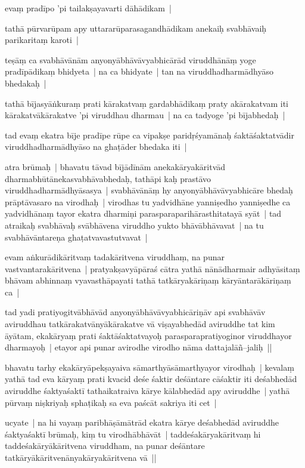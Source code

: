 \documentclass[article,12pt,a4paper]{memoir}
\begin{document}
	  \pstart evaṃ pradīpo 'pi tailakṣayavarti dāhādikam | 
	\pend
      

	  \pstart tathā pūrvarūpam apy uttararūparasagandhādikam anekaiḥ svabhāvaiḥ parikaritaṃ karoti | 
	\pend
      

	  \pstart teṣāṃ ca svabhāvānām anyonyābhāvāvyabhicārād viruddhānāṃ yoge pradīpādikaṃ bhidyeta | na ca bhidyate | tan na viruddhadharmādhyāso bhedakaḥ | 
	\pend
      

	  \pstart tathā bījasyāṅkuraṃ prati kārakatvaṃ gardabhādikaṃ praty akārakatvam iti kārakatvākārakatve 'pi viruddhau dharmau | na ca tadyoge 'pi bījabhedaḥ | 
	\pend
      

	  \pstart tad evaṃ ekatra bīje pradīpe rūpe ca vipakṣe paridṛśyamānaḥ śaktāśaktatvādir viruddhadharmādhyāso na ghaṭāder bhedaka iti |
	\pend
      

	  \pstart atra brūmaḥ | bhavatu tāvad bījādīnām anekakāryakāritvād dharmabhūtānekasvabhāvabhedaḥ, tathāpi kaḥ prastāvo viruddhadharmādhyāsasya | svabhāvānāṃ hy anyonyābhāvāvyabhicāre bhedaḥ prāptāvasaro na virodhaḥ | virodhas tu yadvidhāne yanniṣedho yanniṣedhe ca yadvidhānaṃ tayor ekatra dharmiṇi parasparaparihārasthitatayā syāt | tad atraikaḥ svabhāvaḥ svābhāvena viruddho yukto bhāvābhāvavat | na tu svabhāvāntareṇa ghaṭatvavastutvavat | 
	\pend
      

	  \pstart evam aṅkurādikāritvaṃ tadakāritvena viruddhaṃ, na punar vastvantarakāritvena | pratyakṣavyāpāraś cātra yathā nānādharmair adhyāsitaṃ bhāvam abhinnaṃ vyavasthāpayati tathā tatkāryakāriṇaṃ kāryāntarākāriṇaṃ ca | 
	\pend
      

	  \pstart tad yadi pratiyogitvābhāvād anyonyābhāvāvyabhicāriṇāv api svabhāvāv aviruddhau tatkārakatvānyākārakatve vā viṣayabhedād aviruddhe tat kim āyātam, ekakāryaṃ prati śaktāśaktatvayoḥ parasparapratiyoginor viruddhayor dharmayoḥ | etayor api punar avirodhe virodho nāma dattajalāñ–jaliḥ ||
	\pend
      

	  \pstart bhavatu tarhy ekakāryāpekṣayaiva sāmarthyāsāmarthyayor virodhaḥ | kevalaṃ yathā tad eva kāryaṃ prati kvacid deśe śaktir deśāntare cāśaktir iti deśabhedād aviruddhe śaktyaśaktī tathaikatraiva kārye kālabhedād apy aviruddhe | yathā pūrvaṃ niṣkriyaḥ sphaṭikaḥ sa eva paścāt sakriya iti cet |
	\pend
      

	  \pstart ucyate | na hi vayaṃ paribhāṣāmātrād ekatra kārye deśabhedād aviruddhe śaktyaśaktī brūmaḥ, kiṃ tu virodhābhāvāt | taddeśakāryakāritvaṃ hi taddeśakāryākāritvena viruddham, na punar deśāntare tatkāryākāritvenānyakāryakāritvena vā ||
	\pend
      
\end{document}
